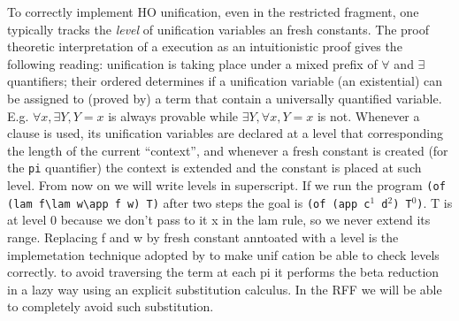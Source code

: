\documentclass{llncs}
\begin{document}
To correctly implement HO unification, even in the restricted \Ll{} fragment,
one typically tracks the \emph{level} of unification variables an fresh constants.  The proof theoretic interpretation of a \lp{} execution as an intuitionistic proof gives the following reading: unification is taking place under
a mixed prefix of $\forall$ and $\exists$ quantifiers; their ordered
determines if a unification variable (an existential) can be assigned to
(proved by) a term that contain a universally quantified variable.
E.g. $\forall x,\exists Y, Y = x$ is always provable while
$\exists Y,\forall x, Y = x$ is not.
Whenever a clause is used, its unification variables are declared at
a level that corresponding the length of the current ``context'', and whenever
a fresh constant is created (for the \verb+pi+ quantifier) the context
is extended and the constant is placed at such level.  From now on we will
write levels in superscript.  If we run the program
\verb+(of (lam f\lam w\app f w) T)+ after two steps the goal is
\verb+(of (app c+$^1$\verb+ d+$^2$\verb+) T+$^0$\verb+)+. T is at level 0 because we don't pass to it x in the lam rule, so we never extend its range.
Replacing f and w by fresh constant anntoated with a level is the implemetation
technique adopted by \tedius{} to make unif cation be able to check
levels correctly.  to avoid traversing the term at each pi it
performs the beta reduction in a lazy way using an explicit substitution calculus.  In the RFF we will be able to completely avoid such substitution.
\end{document}
